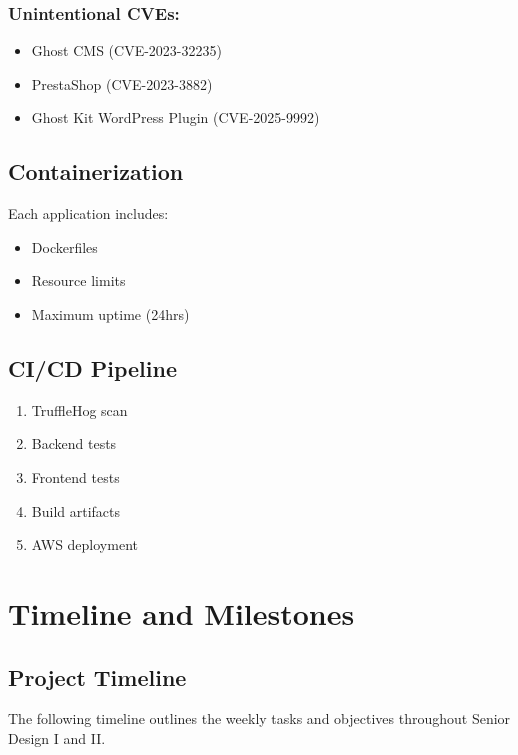 \documentclass[12pt,titlepage]{article}
\begin{document}
\subsubsection{Unintentional CVEs:}
\begin{itemize}
    \item Ghost CMS (CVE-2023-32235)
    \item PrestaShop (CVE-2023-3882)
    \item Ghost Kit WordPress Plugin (CVE-2025-9992)
\end{itemize}

\subsection{Containerization}

Each application includes:
\begin{itemize}
    \item Dockerfiles
    \item Resource limits
    \item Maximum uptime (24hrs)
\end{itemize}

\subsection{CI/CD Pipeline}

\begin{enumerate}
    \item TruffleHog scan
    \item Backend tests
    \item Frontend tests
    \item Build artifacts
    \item AWS deployment
\end{enumerate}

\section{Timeline and Milestones}

\subsection{Project Timeline}
The following timeline outlines the weekly tasks and objectives throughout Senior Design I and II.
\end{document}
